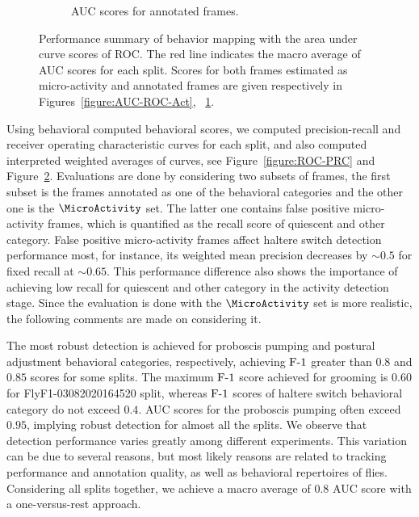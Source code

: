 \begin{figure}[htb!]
\begin{subfigure}[b]{0.5\linewidth}
		\caption{AUC scores for annotated frames. \label{figure:AUC-ROC-Ann}}
	\end{subfigure}%
	\caption[Performance summary of behavior mapping with the area under curve scores of ROC.]
	{Performance summary of behavior mapping with the area under curve scores of ROC.
		The red line indicates the macro average of AUC scores for each split.
		Scores for both frames estimated as micro-activity and annotated frames are given respectively in Figures~\ref{figure:AUC-ROC-Act}, ~\ref{figure:AUC-ROC-Ann}.
		\label{figure:AUC}}
\end{figure}

Using behavioral computed behavioral scores, we computed precision-recall and receiver operating characteristic curves for each split, and also computed interpreted weighted averages of curves, see Figure~\ref{figure:ROC-PRC} and Figure~\ref{figure:AUC}.
Evaluations are done by considering two subsets of frames, the first subset is the frames annotated as one of the behavioral categories and the other one is the $\MicroActivity$ set.
The latter one contains false positive micro-activity frames, which is quantified as the recall score of quiescent and other category.
False positive micro-activity frames affect haltere switch detection performance most, for instance, its weighted mean precision decreases by ${\sim}0.5$ for fixed recall at ${\sim}0.65$.
This performance difference also shows the importance of achieving low recall for quiescent and other category in the activity detection stage.
Since the evaluation is done with the $\MicroActivity$ set is more realistic, the following comments are made on considering it.

The most robust detection is achieved for proboscis pumping and postural adjustment behavioral categories, respectively, achieving $\textnormal{F-}1$ greater than $0.8$ and $0.85$ scores for some splits.
The maximum $\textnormal{F-}1$ score achieved for grooming is $0.60$ for FlyF1-03082020164520 split, whereas $\textnormal{F-}1$ scores of haltere switch behavioral category do not exceed $0.4$.
AUC scores for the proboscis pumping often exceed $0.95$, implying robust detection for almost all the splits.
We observe that detection performance varies greatly among different experiments. This variation can be due to several reasons, but most likely reasons are related to tracking performance and annotation quality, as well as behavioral repertoires of flies.
Considering all splits together, we achieve a macro average of $0.8$ AUC score with a one-versus-rest approach.

